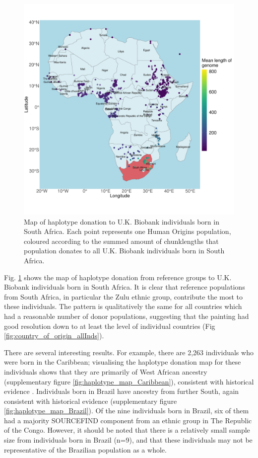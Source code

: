\begin{figure}[htp]
    \centering
    \includegraphics[width=1.0\textwidth]{../images/chapter3/haplotype_map_SouthAfrica.pdf}
    \caption{Map of haplotype donation to U.K. Biobank individuals born in South Africa. Each point represents one Human Origins population, coloured according to the summed amount of chunklengths that population donates to all U.K. Biobank individuals born in South Africa. }
    \label{fig:haplotype_map_SouthAfrica}
\end{figure}

Fig. \ref{fig:haplotype_map_SouthAfrica} shows the map of haplotype donation from reference groups to U.K. Biobank individuals born in South Africa. It is clear that reference populations from South Africa, in particular the Zulu ethnic group, contribute the most to these individuals. The pattern is qualitatively the same for all countries which had a reasonable number of donor populations, suggesting that the painting had good resolution down to at least the level of individual countries (Fig \ref{fig:country_of_origin_allInds}).

There are several interesting results. For example, there are 2,263 individuals who were born in the Caribbean; visualising the haplotype donation map for these individuals shows that they are primarily of West African ancestry (supplementary figure \ref{fig:haplotype_map_Caribbean}), consistent with historical evidence \cite{micheletti2020genetic}. Individuals born in Brazil have ancestry from further South, again consistent with historical evidence (supplementary figure \ref{fig:haplotype_map_Brazil}). Of the nine individuals born in Brazil, six of them had a majority SOURCEFIND component from an ethnic group in The Republic of the Congo. However, it should be noted that there is a relatively small sample size from individuals born in Brazil (n=9), and that these individuals may not be representative of the Brazilian population as a whole. 

